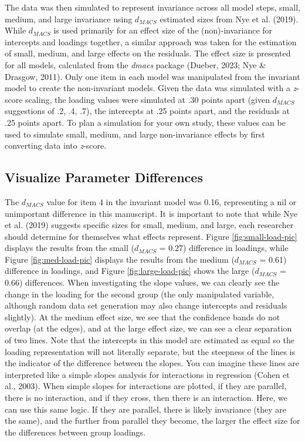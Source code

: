 \documentclass[
  man]{apa7}
\begin{document}
The data was then simulated to represent invariance across all model steps, small, medium, and large invariance using \(d_{MACS}\) estimated sizes from Nye et al. (2019). While \(d_{MACS}\) is used primarily for an effect size of the (non)-invariance for intercepts and loadings together, a similar approach was taken for the estimation of small, medium, and large effects on the residuals. The effect size is presented for all models, calculated from the \emph{dmacs} package (Dueber, 2023; Nye \& Drasgow, 2011). Only one item in each model was manipulated from the invariant model to create the non-invariant models. Given the data was simulated with a \emph{z}-score scaling, the loading values were simulated at .30 points apart (given \(d_{MACS}\) suggestions of .2, .4, .7), the intercepts at .25 points apart, and the residuals at .25 points apart. To plan a simulation for your own study, these values can be used to simulate small, medium, and large non-invariance effects by first converting data into \emph{z}-score.

\subsection{Visualize Parameter Differences}\label{visualize-parameter-differences}

The \(d_{MACS}\) value for item 4 in the invariant model was 0.16, representing a nil or unimportant difference in this manuscript. It is important to note that while Nye et al. (2019) suggests specific sizes for small, medium, and large, each researcher should determine for themselves what effects represent. Figure \ref{fig:small-load-pic} displays the results from the small (\(d_{MACS}\) = 0.27) difference in loadings, while Figure \ref{fig:med-load-pic} displays the results from the medium (\(d_{MACS}\) = 0.61) difference in loadings, and Figure \ref{fig:large-load-pic} shows the large (\(d_{MACS}\) = 0.66) differences. When investigating the slope values, we can clearly see the change in the loading for the second group (the only manipulated variable, although random data set generation may also change intercepts and residuals slightly). At the medium effect size, we see that the confidence bands do not overlap (at the edges), and at the large effect size, we can see a clear separation of two lines. Note that the intercepts in this model are estimated as equal so the loading representation will not literally separate, but the steepness of the lines is the indicator of the difference between the slopes. You can imagine these lines are interpreted like a simple slopes analysis for interactions in regression (Cohen et al., 2003). When simple slopes for interactions are plotted, if they are parallel, there is no interaction, and if they cross, then there is an interaction. Here, we can use this same logic. If they are parallel, there is likely invariance (they are the same), and the further from parallel they become, the larger the effect size for the differences between group loadings.
\end{document}
